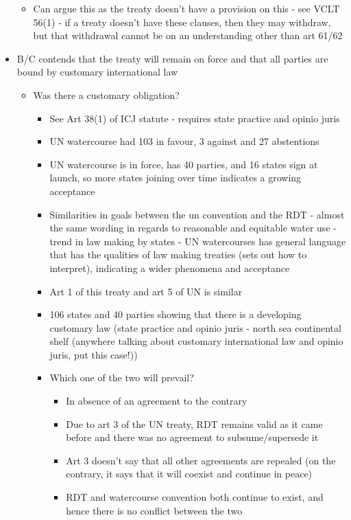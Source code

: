 \begin{itemize}
\begin{itemize}
        \item Can argue this as the treaty doesn't have a provision on this - see VCLT 56(1) - if a treaty doesn't have these clauses, then they may withdraw, but that withdrawal cannot be on an understanding other than art 61/62        
    \end{itemize}
    \item B/C contends that the treaty will remain on force and that all parties are bound by customary international law
    \begin{itemize}
        \item Was there a customary obligation?
        \begin{itemize}
            \item See Art 38(1) of ICJ statute - requires state practice and opinio juris
            \item UN watercourse had 103 in favour, 3 against and 27 abstentions
            \item UN watercourse is in force, has 40 parties, and 16 states sign at launch, so more states joining over time indicates a growing acceptance
            \item Similarities in goals between the un convention and the RDT - almost the same wording in regards to reasonable and equitable water use - trend in law making by states - UN watercourses has general language that has the qualities of law making treaties (sets out how to interpret), indicating a wider phenomena and acceptance
            \item Art 1 of this treaty and art 5 of UN is similar
            \item 106 states and 40 parties showing that there is a developing customary law (state practice and opinio juris - north sea continental shelf (anywhere talking about customary international law and opinio juris, put this case!))
            \item Which one of the two will prevail?
            \begin{itemize}
                \item In absence of an agreement to the contrary
                \item Due to art 3 of the UN treaty, RDT remains valid as it came before and there was no agreement to subsume/supersede it
                \item Art 3 doesn't say that all other agreements are repealed (on the contrary, it says that it will coexist and continue in peace)
                \item RDT and watercourse convention both continue to exist, and hence there is no conflict between the two

\end{itemize}
\end{itemize}
\end{itemize}
\end{itemize}
